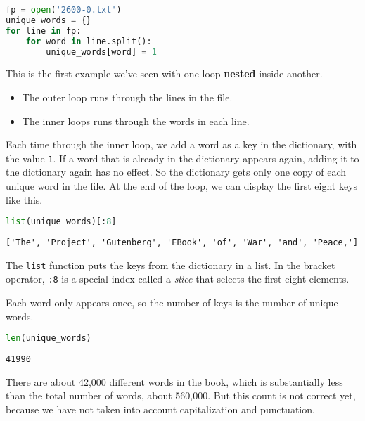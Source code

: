\begin{lstlisting}[language=Python,style=source]
fp = open('2600-0.txt')
unique_words = {}
for line in fp:
    for word in line.split():
        unique_words[word] = 1
\end{lstlisting}

This is the first example we've seen with one loop \textbf{nested}
inside another.

\begin{itemize}
\item
  The outer loop runs through the lines in the file.
\item
  The inner loops runs through the words in each line.
\end{itemize}

Each time through the inner loop, we add a word as a key in the
dictionary, with the value \passthrough{\lstinline!1!}. If a word that
is already in the dictionary appears again, adding it to the dictionary
again has no effect. So the dictionary gets only one copy of each unique
word in the file. At the end of the loop, we can display the first eight
keys like this.

\begin{lstlisting}[language=Python,style=source]
list(unique_words)[:8]
\end{lstlisting}

\begin{lstlisting}[style=output]
['The', 'Project', 'Gutenberg', 'EBook', 'of', 'War', 'and', 'Peace,']
\end{lstlisting}

The \passthrough{\lstinline!list!} function puts the keys from the
dictionary in a list. In the bracket operator,
\passthrough{\lstinline!:8!} is a special index called a \emph{slice}
that selects the first eight elements.

Each word only appears once, so the number of keys is the number of
unique words.

\begin{lstlisting}[language=Python,style=source]
len(unique_words)
\end{lstlisting}

\begin{lstlisting}[style=output]
41990
\end{lstlisting}

There are about 42,000 different words in the book, which is
substantially less than the total number of words, about 560,000. But
this count is not correct yet, because we have not taken into account
capitalization and punctuation.

